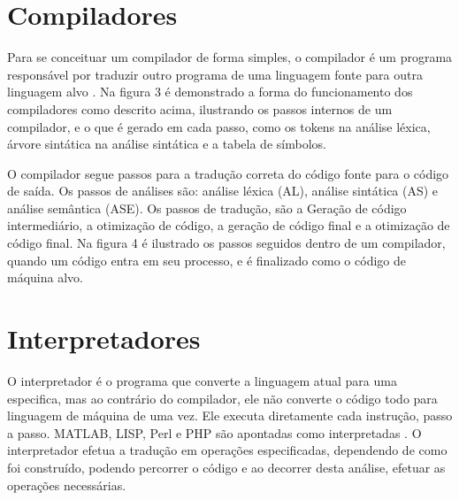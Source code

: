 \documentclass[12pt,oneside,a4paper,chapter=TITLE,section=TITLE,sumario=tradicional]{abntex2}
\begin{document}
\begin{figure}[htb]
\end{figure}

\section{Compiladores}
\label{sec:compiladores}

Para se conceituar um compilador de forma simples, o compilador é um programa responsável por traduzir outro programa de uma linguagem fonte para outra linguagem alvo \cite{alfred1995}. Na figura 3 é demonstrado a forma do funcionamento dos compiladores como descrito acima, ilustrando os passos internos de um compilador, e o que é gerado em cada passo, como os tokens na análise léxica, árvore sintática na análise sintática e a tabela de símbolos.

\begin{figure}[htb]
\end{figure}

O compilador segue passos para a tradução correta do código fonte para o código de saída. Os passos de análises são: análise léxica (AL), análise sintática (AS) e análise semântica (ASE). Os passos de tradução, são a Geração de código intermediário, a otimização de código, a geração de código final e a otimização de código final. Na figura 4 é ilustrado os passos seguidos dentro de um compilador, quando um código entra em seu processo, e é finalizado como o código de máquina alvo.

\begin{figure}[htb]
\end{figure}


\section{Interpretadores}
\label{sec:interpretadores}

O interpretador é o programa que converte a linguagem atual para uma especifica, mas ao contrário do compilador, ele não converte o código todo para linguagem de máquina de uma vez. Ele executa diretamente cada instrução, passo a passo. MATLAB, LISP, Perl e PHP são apontadas como interpretadas \cite{penelope2019}.  O interpretador efetua a tradução em operações especificadas, dependendo de como foi construído, podendo percorrer o código e ao decorrer desta análise, efetuar as operações necessárias. 
\end{document}
